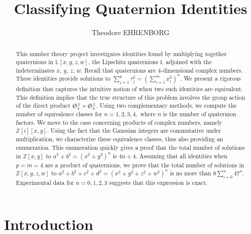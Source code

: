 \documentclass[12pt,table]{article}
\theoremstyle{definition}
\theoremstyle{remark}
\newcommand{\Zzz}{\mathbb Z}
\newcommand{\Lll}{\mathbb L}
\numberwithin{equation}{section}
\begin{document}


\title{Classifying Quaternion Identities}


\author{\sc Theodore EHRENBORG
}



\date{}

\maketitle



\begin{abstract}
This number theory project investigates identities found by
multiplying together quaternions in $ \Lll[x,y,z,w] $, the
Lipschitz quaternions $ \Lll $ adjoined with the
indeterminates $x$, $y$, $z$, $w$.  Recall that quaternions
are $4$-dimensional complex numbers.  These identities provide
solutions to $ \sum_{j = 1}^{p} \tau_j ^ 2 = \left( \sum_{i = 1}^{m}
x_i ^ 2 \right) ^ n $. We present a rigorous definition that captures
the intuitive notion of when two such identities are equivalent. This
definition implies that the true structure of this problem involves the
group action of the direct product $ \mathfrak{S}_4^\pm \times \mathfrak{S}_4^\pm $.  Using
two complementary methods, we compute the number of equivalence
classes for $n = 1, 2, 3, 4,$ where $n$ is the number of
quaternion factors. We move to the case concerning products of complex
numbers, namely $ \Zzz[i][x,y] $. Using the fact that the
Gaussian integers are commutative under multiplication, we
characterize these equivalence classes, thus also providing an
enumeration.
This enumeration quickly gives a proof that
the total number of solutions in $\Zzz[x,y] $
to $a^2 + b^2 = (x^2 + y^2)^n$
is $4n + 4$.
Assuming that all identities when $p = m = 4$
are a product of quaternions, we prove
that
the total number of solutions in $\Zzz[x,y,z,w] $
to $a^2 + b^2 + c^2 + d^2 = (x^2 + y^2 + z^2 + w^2)^n$
is no more than
$ 8 \sum_{i = 0}^n{47^n} $.
Experimental data for $n = 0,1,2,3$
suggests that this expression
is exact.

\end{abstract}





\section{Introduction}
\end{document}

